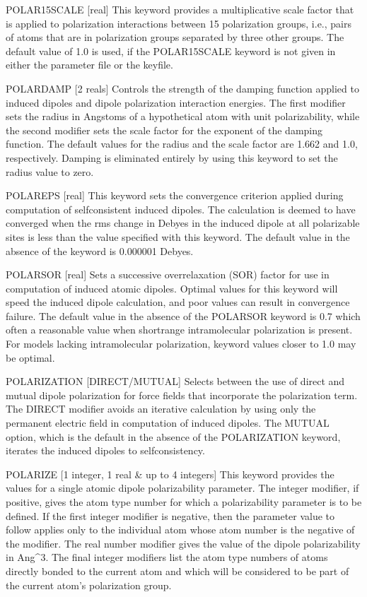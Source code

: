 \documentclass[letterpaper,11pt,english]{sphinxmanual}
\begin{document}
POLAR\sphinxhyphen{}15\sphinxhyphen{}SCALE {[}real{]}     This keyword provides a multiplicative scale factor that is applied to polarization interactions between 1\sphinxhyphen{}5 polarization groups, i.e., pairs of atoms that are in polarization groups separated by three other groups. The default value of 1.0 is used, if the POLAR\sphinxhyphen{}15\sphinxhyphen{}SCALE keyword is not given in either the parameter file or the keyfile.

POLAR\sphinxhyphen{}DAMP {[}2 reals{]}     Controls the strength of the damping function applied to induced dipoles and dipole polarization interaction energies. The first modifier sets the radius in Angstoms of a hypothetical atom with unit polarizability, while the second modifier sets the scale factor for the exponent of the  damping function. The default values for the radius and the scale factor are 1.662 and 1.0, respectively. Damping is eliminated entirely by using this keyword to set the radius value to zero.

POLAR\sphinxhyphen{}EPS {[}real{]}     This keyword sets the convergence criterion applied during computation of self\sphinxhyphen{}consistent induced dipoles. The calculation is deemed to have converged when the rms change in Debyes in the induced dipole at all polarizable sites is less than the value specified with this keyword. The default value in the absence of the keyword is 0.000001 Debyes.

POLAR\sphinxhyphen{}SOR {[}real{]}     Sets a successive overrelaxation (SOR) factor for use in computation of induced atomic dipoles. Optimal values for this keyword will speed the induced dipole calculation, and poor values can result in convergence failure. The default value in the absence of the POLAR\sphinxhyphen{}SOR keyword is 0.7 which often a reasonable value when short\sphinxhyphen{}range intramolecular polarization is present. For models lacking intramolecular polarization, keyword values closer to 1.0 may be optimal.

POLARIZATION {[}DIRECT/MUTUAL{]}     Selects between the use of direct and mutual dipole polarization for force fields that incorporate the polarization term. The DIRECT modifier avoids an iterative calculation by using only the permanent electric field in computation of induced dipoles. The MUTUAL option, which is the default in the absence of the POLARIZATION keyword, iterates the induced dipoles to self\sphinxhyphen{}consistency.

POLARIZE {[}1 integer, 1 real \& up to 4 integers{]}     This keyword provides the values for a single atomic dipole polarizability parameter. The integer modifier, if positive, gives the atom type number for which a polarizability parameter is to be defined. If the first integer modifier is negative, then the parameter value to follow applies only to the individual atom whose atom number is the negative of the modifier. The real number modifier gives the value of the dipole polarizability in Ang\textasciicircum{}3. The final integer modifiers list the atom type numbers of atoms directly bonded to the current atom and which will be considered to be part of the current atom’s polarization group.
\end{document}
